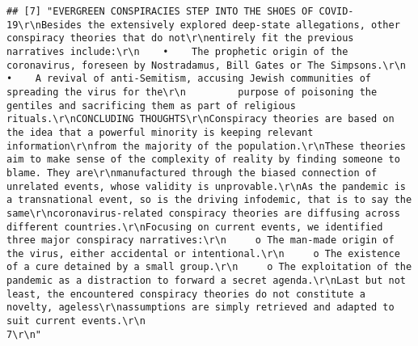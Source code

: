 \documentclass[
]{book}
\begin{document}
\begin{verbatim}
## [7] "EVERGREEN CONSPIRACIES STEP INTO THE SHOES OF COVID-19\r\nBesides the extensively explored deep-state allegations, other conspiracy theories that do not\r\nentirely fit the previous narratives include:\r\n    •    The prophetic origin of the coronavirus, foreseen by Nostradamus, Bill Gates or The Simpsons.\r\n    •    A revival of anti-Semitism, accusing Jewish communities of spreading the virus for the\r\n         purpose of poisoning the gentiles and sacrificing them as part of religious rituals.\r\nCONCLUDING THOUGHTS\r\nConspiracy theories are based on the idea that a powerful minority is keeping relevant information\r\nfrom the majority of the population.\r\nThese theories aim to make sense of the complexity of reality by finding someone to blame. They are\r\nmanufactured through the biased connection of unrelated events, whose validity is unprovable.\r\nAs the pandemic is a transnational event, so is the driving infodemic, that is to say the same\r\ncoronavirus-related conspiracy theories are diffusing across different countries.\r\nFocusing on current events, we identified three major conspiracy narratives:\r\n     o The man-made origin of the virus, either accidental or intentional.\r\n     o The existence of a cure detained by a small group.\r\n     o The exploitation of the pandemic as a distraction to forward a secret agenda.\r\nLast but not least, the encountered conspiracy theories do not constitute a novelty, ageless\r\nassumptions are simply retrieved and adapted to suit current events.\r\n                                                                                                    7\r\n"                                                                                                                                                                                                                                                                                                                                                                                                                                                                                                                                                                                                                                                                                                                                                                                                                                                                                                                                                                                                                                                                                                                                                                                                                                                                                                                                                                                                                                                                                                                                                                                                                                                                                                                                           
\end{verbatim}
\end{document}
